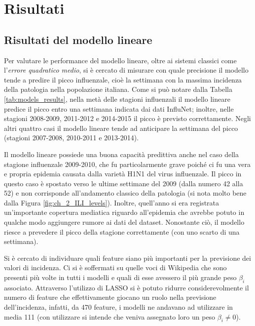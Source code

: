 \chapter{Risultati}
\bigskip

\section{Risultati del modello lineare}
\bigskip

Per valutare le performance del modello lineare, oltre ai sistemi classici come l'\textit{errore quadratico medio}, si è 
cercato di misurare con quale precisione il modello tende a predire il picco influenzale, cioè la settimana con la massima 
incidenza della patologia nella popolazione italiana. Come si può notare dalla Tabella \ref{tab:models_results}, nella metà 
delle stagioni influenzali il modello lineare predice il picco entro una settimana indicata dai dati InfluNet; inoltre, nelle 
stagioni 2008-2009, 2011-2012 e 2014-2015 il picco è previsto correttamente. Negli altri quattro casi il modello lineare 
tende ad anticipare la settimana del picco (stagioni 2007-2008, 2010-2011 e 2013-2014).
\bigskip

Il modello lineare possiede una buona capacità predittiva anche nel caso della stagione influenzale 2009-2010, che fu 
particolarmente grave poiché ci fu una vera e propria epidemia causata dalla varietà H1N1 del virus influenzale. Il picco in 
questo caso è spostato verso le ultime settimane del 2009 (dalla numero 42 alla 52) e non corrisponde all'andamento 
classico della patologia (si nota molto bene dalla Figura \ref{fig:ch_2_ILI_levels}). Inoltre, quell'anno si era registrata 
un'importante copertura mediatica riguardo all'epidemia che avrebbe potuto in qualche modo aggiungere rumore ai dati 
del dataset. Nonostante ciò, il modello riesce a prevedere il picco della stagione correttamente (con uno scarto di una 
settimana).
\bigskip

Si è cercato di individuare quali feature siano più importanti per la previsione dei valori di incidenza. Ci si è 
soffermati su quelle voci di Wikipedia che sono presenti più volte in tutti i modelli e quali di esse avessero il più grande 
peso $\beta_i$ associato. Attraverso l'utilizzo di LASSO si è potuto ridurre considerevolmente il numero di feature che 
effettivamente giocano un ruolo nella previsione dell'incidenza, infatti, da 470 feature, i modelli ne andavano 
ad utilizzare in media 111 (con utilizzare si intende che veniva assegnato loro un peso $\beta_i \neq 0$). 
\bigskip

